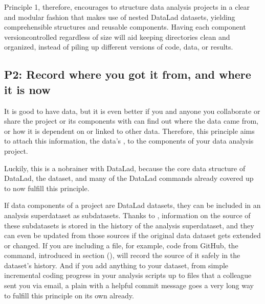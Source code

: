 \sphinxAtStartPar
Principle 1, therefore, encourages to structure data analysis
projects in a clear and modular fashion that makes use of nested
DataLad datasets, yielding comprehensible structures and reusable
components. Having each component version\sphinxhyphen{}controlled \textendash{}
regardless of size \textendash{}  will aid keeping directories clean and
organized, instead of piling up different versions of code, data,
or results.


\subsection{P2: Record where you got it from, and where it is now}
\label{\detokenize{basics/101-127-yoda:p2-record-where-you-got-it-from-and-where-it-is-now}}\label{\detokenize{basics/101-127-yoda:p2}}
\sphinxAtStartPar
It is good to have data, but it is even better if you and anyone you
collaborate or share the project or its components with can find
out where the data came from, or how it
is dependent on or linked to other data. Therefore, this principle
aims to attach this information, the data’s {\hyperref[\detokenize{glossary:term-provenance}]{}}, to the components of
your data analysis project.

\sphinxAtStartPar
Luckily, this is a no\sphinxhyphen{}brainer with DataLad, because the core data structure
of DataLad, the dataset, and many of the DataLad commands already covered
up to now fulfill this principle.

\sphinxAtStartPar
If data components of a project are DataLad datasets, they can
be included in an analysis superdataset as subdatasets. Thanks to
, information on the source of these subdatasets
is stored in the history of the analysis superdataset, and they can even be
updated from those sources if the original data dataset gets extended or changed.
If you are including a file, for example, code from GitHub,
the  command, introduced in section {\hyperref[\detokenize{basics/101-102-populate:populate}]{}} (),
will record the source of it safely in the dataset’s history. And if you add anything to your dataset,
from simple incremental coding progress in your analysis scripts up to
files that a colleague sent you via email, a plain 
with a helpful commit message goes a very long way to fulfill this principle
on its own already.

